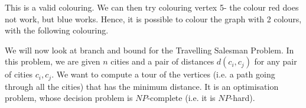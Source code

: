\documentclass[a4paper, openany]{memoir}
\begin{document}
    \noindent This is a valid colouring. We can then try colouring vertex 5- the colour red does not work, but blue works. Hence, it is possible to colour the graph with 2 colours, with the following colouring.
    \begin{figure}[H]
        \centering
    \end{figure}

    We will now look at branch and bound for the Travelling Salesman Problem. In this problem, we are given $n$ cities and a pair of distances $d(c_i, c_j)$ for any pair of cities $c_i, c_j$. We want to compute a tour of the vertices (i.e. a path going through all the cities) that has the minimum distance. It is an optimisation problem, whose decision problem is $NP$-complete (i.e. it is $NP$-hard).
\end{document}
